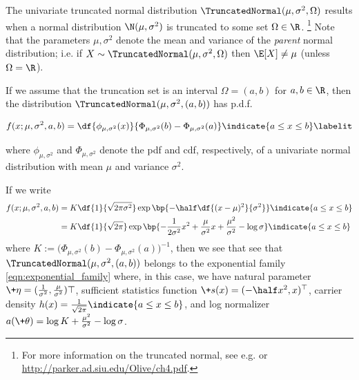 \documentclass{article} %
\newcommand{\sufficientStatsFunction}{\+s}
\newcommand{\carrierDensity}{h}
\newcommand{\param}{\+\theta}
\newcommand{\naturalParam}{\+\eta}
\begin{document}
\begin{example}
 The univariate truncated normal distribution $\TruncatedNormal(\mu,  \sigma^2,  \Omega)$ results when a normal distribution $\N(\mu,  \sigma^2)$ is truncated to some set $\Omega \in \R$. \footnote{For more information on the truncated normal,  see e.g.  \cite{burkardt2014truncated} or \url{http://parker.ad.siu.edu/Olive/ch4.pdf}.}   Note that the parameters $\mu, \sigma^2$ denote the mean and variance of the \textit{parent} normal distribution;  i.e.  if $X \sim \TruncatedNormal(\mu,  \sigma^2,  \Omega)$ then $\E[X] \neq \mu$ (unless $\Omega = \R$). 

If we assume that the truncation set is an interval $\Omega = (a,b)$ for $a,b \in \R$,  then the distribution $\TruncatedNormal(\mu,  \sigma^2,  (a,b))$ has p.d.f.

\begin{align*}
f(x ; \mu,  \sigma^2,  a,  b) = \df{\phi_{\mu, \sigma^2} (x) }{\Phi_{\mu, \sigma^2} (b)  - \Phi_{\mu, \sigma^2} (a) } \indicate{a \leq x \leq b} \labelit \label{eqn:pdf_of_normal_truncated_to_an_interval}
\end{align*} 

where $\phi_{\mu,  \sigma^2}$ and $\Phi_{\mu,  \sigma^2}$ denote the pdf and cdf,  respectively,  of a univariate normal distribution with mean $\mu$ and variance $\sigma^2$.   

If we write
\begin{align*}
f(x ; \mu,  \sigma^2,  a,  b) & = K \df{1}{\sqrt{2 \pi \sigma^2}} \exp \bp{-\half \df{(x-\mu)^2}{\sigma^2}}  \indicate{a \leq x \leq b} \\
& = K \df{1}{\sqrt{2 \pi}} \exp \bp{ - \frac{1}{2 \sigma^2} x^2 + \frac{\mu}{\sigma^2} x  + \frac{\mu^2}{\sigma^2}  - \log \sigma}  \indicate{a \leq x \leq b} 
\end{align*} 
where $K := \big( \Phi_{\mu, \sigma^2} (b)  - \Phi_{\mu, \sigma^2} (a) \big)^{-1}$,  then we see that see that  $\TruncatedNormal(\mu,  \sigma^2,  (a,b))$ belongs to the exponential family \eqref{eqn:exponential_family} where,  in this case,  we have natural parameter $\naturalParam = (\frac{1}{\sigma^2},  \frac{\mu}{\sigma^2})\top$,  sufficient statistics function $\sufficientStatsFunction(x) = (-\half x^2,  x)^\top$,  carrier density $\carrierDensity(x) =  \frac{1}{\sqrt{2 \pi}}  \indicate{a \leq x \leq b}$,  and log normalizer $a(\param) = \log K + \frac{\mu^2}{\sigma^2} - \log \sigma$.
\label{ex:truncated_normal_as_ef}
\end{example}
\end{document}
